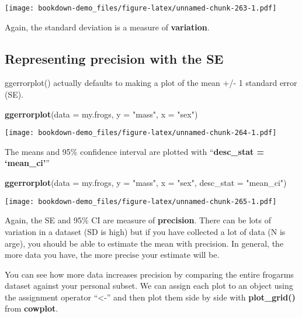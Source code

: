 \documentclass[]{book}
\newenvironment{Shaded}{\begin{snugshade}}{\end{snugshade}}
\newcommand{\KeywordTok}[1]{\textcolor[rgb]{0.13,0.29,0.53}{\textbf{#1}}}
\newcommand{\DataTypeTok}[1]{\textcolor[rgb]{0.13,0.29,0.53}{#1}}
\newcommand{\StringTok}[1]{\textcolor[rgb]{0.31,0.60,0.02}{#1}}
\newcommand{\NormalTok}[1]{#1}
\theoremstyle{definition}
\theoremstyle{definition}
\theoremstyle{definition}
\theoremstyle{remark}
\begin{document}
\texttt{[image: bookdown-demo\_files/figure-latex/unnamed-chunk-263-1.pdf]}

Again, the standard deviation is a measure of \textbf{variation}.

\subsection{Representing precision with the
SE}\label{representing-precision-with-the-se}

ggerrorplot() actually defaults to making a plot of the mean +/- 1
standard error (SE).

\begin{Shaded}
\begin{Highlighting}[]
\KeywordTok{ggerrorplot}\NormalTok{(}\DataTypeTok{data =}\NormalTok{ my.frogs,}
          \DataTypeTok{y =} \StringTok{"mass"}\NormalTok{,}
          \DataTypeTok{x =} \StringTok{"sex"}\NormalTok{)}
\end{Highlighting}
\end{Shaded}

\texttt{[image: bookdown-demo\_files/figure-latex/unnamed-chunk-264-1.pdf]}

The means and 95\% confidence interval are plotted with
``\textbf{desc\_stat = `mean\_ci'}''

\begin{Shaded}
\begin{Highlighting}[]
\KeywordTok{ggerrorplot}\NormalTok{(}\DataTypeTok{data =}\NormalTok{ my.frogs,}
          \DataTypeTok{y =} \StringTok{"mass"}\NormalTok{,}
          \DataTypeTok{x =} \StringTok{"sex"}\NormalTok{,}
          \DataTypeTok{desc_stat =} \StringTok{"mean_ci"}\NormalTok{)}
\end{Highlighting}
\end{Shaded}

\texttt{[image: bookdown-demo\_files/figure-latex/unnamed-chunk-265-1.pdf]}

Again, the SE and 95\% CI are measure of \textbf{precision}. There can
be lots of variation in a dataset (SD is high) but if you have collected
a lot of data (N is arge), you should be able to estimate the mean with
precision. In general, the more data you have, the more precise your
estimate will be.

You can see how more data increases precision by comparing the entire
frogarms dataset against your personal subset. We can assign each plot
to an object using the assignment operator ``\textless{}-'' and then
plot them side by side with \textbf{plot\_grid()} from \textbf{cowplot}.
\end{document}
